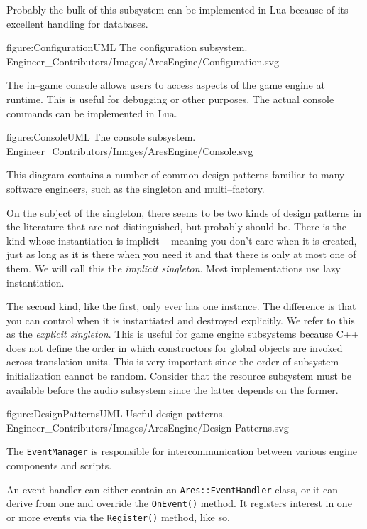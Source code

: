 Probably the bulk of this subsystem can be implemented in Lua because of its excellent handling for databases.

\FullPageDiagram
    {figure:ConfigurationUML}
    {The configuration subsystem.}
    {Engineer_Contributors/Images/AresEngine/Configuration.svg}

\page
{}
The in--game console allows users to access aspects of the game engine at runtime. This is useful for debugging or other purposes. The actual console commands can be implemented in Lua.

\FullPageDiagram
    {figure:ConsoleUML}
    {The console subsystem.}
    {Engineer_Contributors/Images/AresEngine/Console.svg}

\page
{}
This diagram contains a number of common design patterns familiar to many software engineers, such as the singleton and multi--factory.

On the subject of the singleton, there seems to be two kinds of design patterns in the literature that are not distinguished, but probably should be. There is the kind whose instantiation is implicit -- meaning you don't care when it is created, just as long as it is there when you need it and that there is only at most one of them. We will call this the {\it implicit singleton}. Most implementations use lazy instantiation.

The second kind, like the first, only ever has one instance. The difference is that you can control when it is instantiated and destroyed explicitly. We refer to this as the {\it explicit singleton}. This is useful for game engine subsystems because C++ does not define the order in which constructors for global objects are invoked across translation units. This is very important since the order of subsystem initialization cannot be random. Consider that the resource subsystem must be available before the audio subsystem since the latter depends on the former.

\FullPageDiagram
    {figure:DesignPatternsUML}
    {Useful design patterns.}
    {Engineer_Contributors/Images/AresEngine/Design Patterns.svg}

\page 
{}
The {\tt EventManager} is responsible for intercommunication between various engine components and scripts.

An event handler can either contain an {\tt Ares::EventHandler} class, or it can derive from one and override the {\tt OnEvent()} method. It registers interest in one or more events via the {\tt Register()} method, like so.

